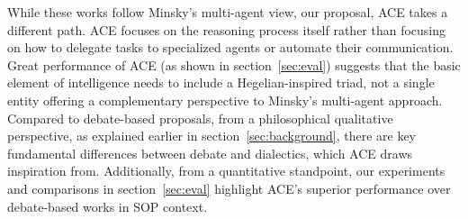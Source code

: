 While these works follow Minsky’s multi-agent view, our proposal, ACE takes a different path. ACE focuses on the reasoning process itself rather than focusing on how to delegate tasks to specialized agents or automate their communication. Great performance of ACE (as shown in section~\ref{sec:eval}) suggests that the basic element of intelligence needs to include a Hegelian-inspired triad, not a single entity offering a complementary perspective to Minsky’s multi-agent approach. Compared to debate-based proposals, from a philosophical qualitative perspective, as explained earlier in section~\ref{sec:background}, there are key fundamental differences between debate and dialectics, which ACE draws inspiration from. Additionally, from a quantitative standpoint, our experiments and comparisons in section~\ref{sec:eval} highlight ACE's superior performance over debate-based works in SOP context.
